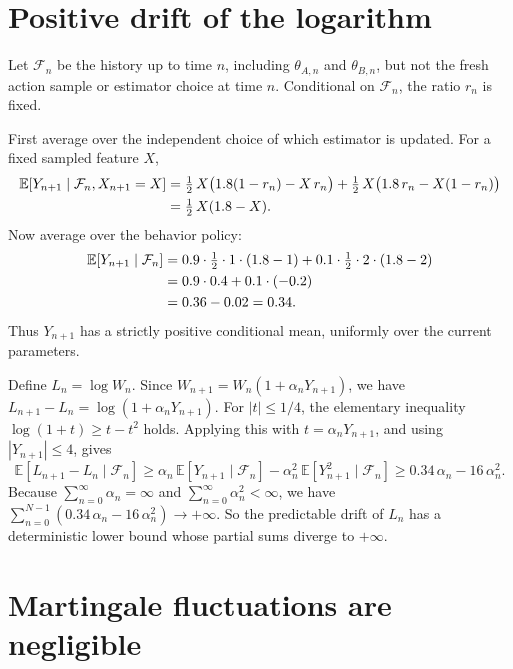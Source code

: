 \documentclass[11pt]{article}
\begin{document}
\section{Positive drift of the logarithm}

Let $\mathcal{F}_n$ be the history up to time $n$, including $\theta_{A,n}$ and $\theta_{B,n}$, but not the fresh action sample or estimator choice at time $n$. Conditional on $\mathcal{F}_n$, the ratio $r_n$ is fixed.

First average over the independent choice of which estimator is updated. For a fixed sampled feature $X$,
\begin{align}
\mathbb{E}[Y_{n+1} \mid \mathcal{F}_n, X_{n+1} = X]
&= \tfrac{1}{2}\, X\bigl(1.8(1 - r_n) - X\,r_n\bigr)
 + \tfrac{1}{2}\, X\bigl(1.8\,r_n - X(1 - r_n)\bigr) \notag \\
&= \tfrac{1}{2}\, X(1.8 - X). \label{eq:cond-mean-x}
\end{align}
Now average over the behavior policy:
\begin{align}
\mathbb{E}[Y_{n+1} \mid \mathcal{F}_n]
&= 0.9 \cdot \tfrac{1}{2} \cdot 1 \cdot (1.8 - 1)
 + 0.1 \cdot \tfrac{1}{2} \cdot 2 \cdot (1.8 - 2) \notag \\
&= 0.9 \cdot 0.4 + 0.1 \cdot (-0.2) \notag \\
&= 0.36 - 0.02 = 0.34. \label{eq:drift}
\end{align}
Thus $Y_{n+1}$ has a strictly positive conditional mean, uniformly over the current parameters.

Define $L_n = \log W_n$. Since $W_{n+1} = W_n(1 + \alpha_n Y_{n+1})$, we have $L_{n+1} - L_n = \log(1 + \alpha_n Y_{n+1})$. For $|t| \leq 1/4$, the elementary inequality $\log(1 + t) \geq t - t^2$ holds. Applying this with $t = \alpha_n Y_{n+1}$, and using $|Y_{n+1}| \leq 4$, gives
\begin{equation}\label{eq:log-drift-bound}
\mathbb{E}[L_{n+1} - L_n \mid \mathcal{F}_n]
\geq \alpha_n\,\mathbb{E}[Y_{n+1} \mid \mathcal{F}_n] - \alpha_n^2\,\mathbb{E}[Y_{n+1}^2 \mid \mathcal{F}_n]
\geq 0.34\,\alpha_n - 16\,\alpha_n^2.
\end{equation}
Because $\sum_{n=0}^{\infty} \alpha_n = \infty$ and $\sum_{n=0}^{\infty} \alpha_n^2 < \infty$, we have $\sum_{n=0}^{N-1}(0.34\,\alpha_n - 16\,\alpha_n^2) \to +\infty$. So the predictable drift of $L_n$ has a deterministic lower bound whose partial sums diverge to $+\infty$.

\section{Martingale fluctuations are negligible}
\end{document}
